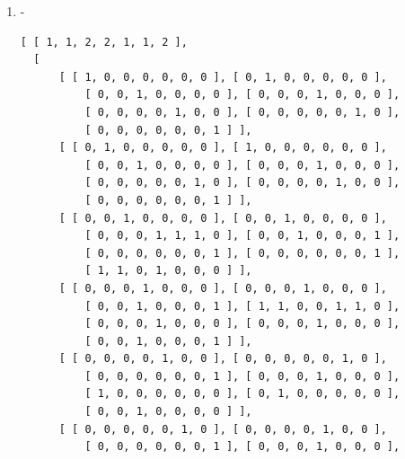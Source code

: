 \documentclass[a4paper, 10pt]{book}
\theoremstyle{definition}
\numberwithin{equation}{chapter}
\begin{document}
\begin{appendices}
\begin{enumerate}
\begin{lstlisting}[numbers=none]
         ], 
      [ [ 0, 0, 0, 0, 0, 0, 0, 1, 0, 0 ], [ 0, 0, 0, 0, 0, 0, 0, 0, 0, 1 ], 
          [ 0, 0, 0, 0, 0, 0, 0, 0, 1, 0 ], [ 0, 0, 0, 0, 0, 0, 1, 0, 0, 0 ],
          [ 0, 0, 0, 0, 0, 1, 0, 0, 0, 0 ], [ 0, 0, 0, 0, 1, 0, 0, 0, 0, 0 ],
          [ 0, 0, 0, 1, 0, 0, 0, 0, 0, 0 ], [ 1, 0, 0, 0, 0, 0, 0, 0, 0, 0 ],
          [ 0, 0, 1, 0, 0, 0, 0, 0, 0, 0 ], [ 0, 1, 0, 0, 0, 0, 0, 0, 0, 0 ] 
         ], 
      [ [ 0, 0, 0, 0, 0, 0, 0, 0, 1, 0 ], [ 0, 0, 0, 0, 0, 0, 1, 0, 0, 0 ], 
          [ 0, 0, 0, 0, 0, 0, 0, 1, 0, 0 ], [ 0, 0, 0, 0, 0, 0, 0, 0, 0, 1 ],
          [ 0, 0, 0, 0, 1, 0, 0, 0, 0, 0 ], [ 0, 0, 0, 0, 0, 1, 0, 0, 0, 0 ],
          [ 1, 0, 0, 0, 0, 0, 0, 0, 0, 0 ], [ 0, 0, 0, 1, 0, 0, 0, 0, 0, 0 ],
          [ 0, 1, 0, 0, 0, 0, 0, 0, 0, 0 ], [ 0, 0, 1, 0, 0, 0, 0, 0, 0, 0 ] 
         ], 
      [ [ 0, 0, 0, 0, 0, 0, 0, 0, 0, 1 ], [ 0, 0, 0, 0, 0, 0, 0, 1, 0, 0 ], 
          [ 0, 0, 0, 0, 0, 0, 1, 0, 0, 0 ], [ 0, 0, 0, 0, 0, 0, 0, 0, 1, 0 ],
          [ 0, 0, 0, 0, 0, 1, 0, 0, 0, 0 ], [ 0, 0, 0, 0, 1, 0, 0, 0, 0, 0 ],
          [ 0, 0, 1, 0, 0, 0, 0, 0, 0, 0 ], [ 0, 1, 0, 0, 0, 0, 0, 0, 0, 0 ],
          [ 0, 0, 0, 1, 0, 0, 0, 0, 0, 0 ], [ 1, 0, 0, 0, 0, 0, 0, 0, 0, 0 ] 
         ] ] ]
	\end{lstlisting}
	\item -\begin{lstlisting}[numbers=none]
	[ [ 1, 1, 2, 2, 1, 1, 2 ], 
  [ 
      [ [ 1, 0, 0, 0, 0, 0, 0 ], [ 0, 1, 0, 0, 0, 0, 0 ], 
          [ 0, 0, 1, 0, 0, 0, 0 ], [ 0, 0, 0, 1, 0, 0, 0 ], 
          [ 0, 0, 0, 0, 1, 0, 0 ], [ 0, 0, 0, 0, 0, 1, 0 ], 
          [ 0, 0, 0, 0, 0, 0, 1 ] ], 
      [ [ 0, 1, 0, 0, 0, 0, 0 ], [ 1, 0, 0, 0, 0, 0, 0 ], 
          [ 0, 0, 1, 0, 0, 0, 0 ], [ 0, 0, 0, 1, 0, 0, 0 ], 
          [ 0, 0, 0, 0, 0, 1, 0 ], [ 0, 0, 0, 0, 1, 0, 0 ], 
          [ 0, 0, 0, 0, 0, 0, 1 ] ], 
      [ [ 0, 0, 1, 0, 0, 0, 0 ], [ 0, 0, 1, 0, 0, 0, 0 ], 
          [ 0, 0, 0, 1, 1, 1, 0 ], [ 0, 0, 1, 0, 0, 0, 1 ], 
          [ 0, 0, 0, 0, 0, 0, 1 ], [ 0, 0, 0, 0, 0, 0, 1 ], 
          [ 1, 1, 0, 1, 0, 0, 0 ] ], 
      [ [ 0, 0, 0, 1, 0, 0, 0 ], [ 0, 0, 0, 1, 0, 0, 0 ], 
          [ 0, 0, 1, 0, 0, 0, 1 ], [ 1, 1, 0, 0, 1, 1, 0 ], 
          [ 0, 0, 0, 1, 0, 0, 0 ], [ 0, 0, 0, 1, 0, 0, 0 ], 
          [ 0, 0, 1, 0, 0, 0, 1 ] ], 
      [ [ 0, 0, 0, 0, 1, 0, 0 ], [ 0, 0, 0, 0, 0, 1, 0 ], 
          [ 0, 0, 0, 0, 0, 0, 1 ], [ 0, 0, 0, 1, 0, 0, 0 ], 
          [ 1, 0, 0, 0, 0, 0, 0 ], [ 0, 1, 0, 0, 0, 0, 0 ], 
          [ 0, 0, 1, 0, 0, 0, 0 ] ], 
      [ [ 0, 0, 0, 0, 0, 1, 0 ], [ 0, 0, 0, 0, 1, 0, 0 ], 
          [ 0, 0, 0, 0, 0, 0, 1 ], [ 0, 0, 0, 1, 0, 0, 0 ], 

\end{lstlisting}
\end{enumerate}
\end{appendices}
\end{document}
